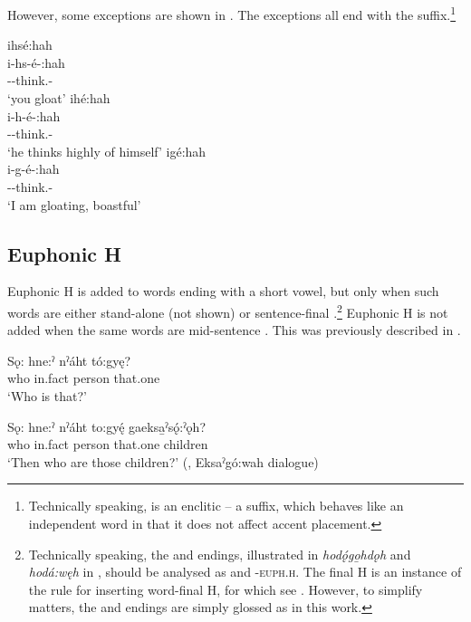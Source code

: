 However, some exceptions are shown in . The exceptions all end with the  \textsc{\diminutive} suffix.\footnote{Technically speaking,  is an enclitic -- a suffix, which behaves like an independent word in that it does not affect accent placement.}

\ea\label{ex:proth4}
\ea ihsé:hah\\
\gll i-hs-é-:hah\\
 {\prothetic}--think.{\stative}-{\diminutive}\\
\glt `you gloat'
\ex ihé:hah\\
\gll i-h-é-:hah\\
 {\prothetic}--think.{\stative}-{\diminutive}\\
\glt `he thinks highly of himself'
\ex igé:hah\\
\gll i-g-é-:hah\\
 {\prothetic}--think.{\stative}-{\diminutive}\\
\glt `I am gloating, boastful'
\z
\z

\subsection{Euphonic H} \label{Word-final pronunciation H}
Euphonic H  is added to words ending with a short vowel, but only when such words are either stand-alone (not shown) or sentence-final .\footnote{Technically speaking, the  and  \textsc{\stative} endings, illustrated in \textit{hodǫ́go̱hdǫh} and \textit{hodá:węh} in , should be analysed as  and  {\stative}-\textsc{euph.h}. The final H is an instance of the rule for inserting word-final H, for which see  . However, to simplify matters, the  and  endings are simply glossed as {\stative} in this work.} Euphonic H is not added when the same words are mid-sentence . This was previously described in .

\ea\label{ex:wdfinalhex} 
 \gll Sǫ: hne:ˀ nˀáht tó:gyę? \\
who in.fact person that.one\\
\glt ‘Who is that?’
\z

\ea\label{ex:wdfinalhex2} 
\gll Sǫ: hne:ˀ nˀáht to:gyę́ gaeksa̱ˀsǫ́:ˀǫh? \\
who in.fact person that.one children\\
\glt ‘Then who are those children?’ (\cite[88]{mithun_watewayestanih_1984}, Eksaˀgó:wah dialogue)
\z

